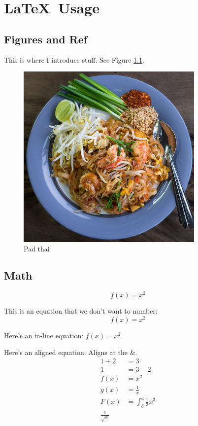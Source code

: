 \documentclass[12pt,letterpaper,titlepage]{report}
\begin{document}
\chapter{\LaTeX\ Usage}

\section{Figures and Ref}
This is where I introduce stuff. See Figure \ref{fig:padthai}.

\begin{figure}[H]   %
	\centering
	\includegraphics[width=3.6in]{images/padthai.jpg}
	\caption{Pad thai}
	\label{fig:padthai}
\end{figure}



\section{Math}

\begin{equation}
	f(x) = x^2
\end{equation}


This is an equation that we don't want to number: $$f(x) = x^2$$

Here's an in-line equation: $f(x) = x^2$.

Here's an aligned equation: Aligns at the \&.
\begin{align*}
	1 + 2 & = 3                       \\
	1     & = 3 - 2                   \\
	f(x)  & = x^2                     \\
	g(x)  & = \frac{1}{x}             \\
	F(x)  & = \int^a_b \frac{1}{3}x^3 \\
	\frac{1}{\sqrt{x}}
\end{align*}
\end{document}
